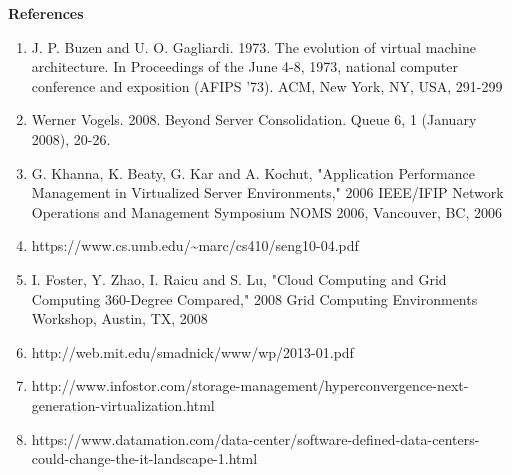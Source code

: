 \documentclass[11pt,a4paper,oneside]{article}
\begin{document}
    \textbf{References}
    \begin{enumerate}
    	\item J. P. Buzen and U. O. Gagliardi. 1973. The evolution of virtual machine architecture. In Proceedings of the June 4-8, 1973, national computer conference and exposition (AFIPS '73). ACM, New York, NY, USA, 291-299
    	\item Werner Vogels. 2008. Beyond Server Consolidation. Queue 6, 1 (January 2008), 20-26. 
    	\item G. Khanna, K. Beaty, G. Kar and A. Kochut, "Application Performance Management in Virtualized Server Environments," 2006 IEEE/IFIP Network Operations and Management Symposium NOMS 2006, Vancouver, BC, 2006
    	\item https://www.cs.umb.edu/\textasciitilde marc/cs410/seng10-04.pdf   
    	\item I. Foster, Y. Zhao, I. Raicu and S. Lu, "Cloud Computing and Grid Computing 360-Degree Compared," 2008 Grid Computing Environments Workshop, Austin, TX, 2008
    	\item http://web.mit.edu/smadnick/www/wp/2013-01.pdf	
    	\item http://www.infostor.com/storage-management/hyperconvergence-next-generation-virtualization.html
    	\item https://www.datamation.com/data-center/software-defined-data-centers-could-change-the-it-landscape-1.html
    \end{enumerate}
 

    
\end{document}
